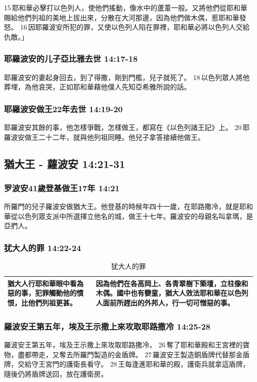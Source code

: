 15 耶和華必擊打以色列人，使他們搖動，像水中的蘆葦一般。又將他們從耶和華賜給他們列祖的美地上拔出來，分散在大河那邊，因為他們做木偶，惹耶和華發怒。 16 因耶羅波安所犯的罪，又使以色列人陷在罪裡，耶和華必將以色列人交給仇敵。」

\subsubsection{耶羅波安的儿子亞比雅去世 14:17-18}
耶羅波安的妻起身回去，到了得撒，剛到門檻，兒子就死了。 18 以色列眾人將他葬埋，為他哀哭，正如耶和華藉他僕人先知亞希雅所說的話。


\subsubsection{耶羅波安做王22年去世 14:19-20}
耶羅波安其餘的事，他怎樣爭戰，怎樣做王，都寫在《以色列諸王記》上。 20 耶羅波安做王二十二年，就與他列祖同睡。他兒子拿答接續他做王。

\subsection{猶大王 - 蘿波安 14:21-31 }
\subsubsection{罗波安41歲登基做王17年 14:21}
所羅門的兒子羅波安做猶大王。他登基的時候年四十一歲，在耶路撒冷，就是耶和華從以色列眾支派中所選擇立他名的城，做王十七年。羅波安的母親名叫拿瑪，是亞捫人。

\subsubsection{犹大人的罪 14:22-24}
\begin{table}[H]
\centering 
\begin{tabular}{p{6cm}|p{11.5cm}}\hline\hline
猶大人行耶和華眼中看為惡的事，犯罪觸動他的憤恨，比他們列祖更甚。&因為他們在各高岡上、各青翠樹下築壇，立柱像和木偶。國中也有孌童，猶大人效法耶和華在以色列人面前所趕出的外邦人，行一切可憎惡的事。\\\hline
\end{tabular}
\caption{犹大人的罪}
\end{table}



\subsubsection{羅波安王第五年，埃及王示撒上來攻取耶路撒冷 14:25-28}
羅波安王第五年，埃及王示撒上來攻取耶路撒冷， 26 奪了耶和華殿和王宮裡的寶物，盡都帶走，又奪去所羅門製造的金盾牌。 27 羅波安王製造銅盾牌代替那金盾牌，交給守王宮門的護衛長看守。 28 王每逢進耶和華的殿，護衛兵就拿這盾牌，隨後仍將盾牌送回，放在護衛房。

